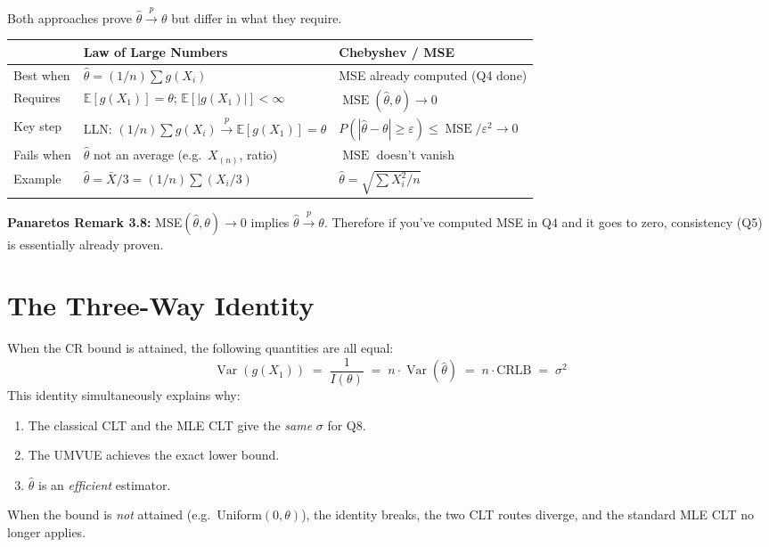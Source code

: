 \documentclass[11pt,a4paper]{article}
\newcommand{\E}{\mathbb{E}}
\newcommand{\Var}{\operatorname{Var}}
\newcommand{\MSE}{\operatorname{MSE}}
\newcommand{\convp}{\xrightarrow{\,p\,}}
\begin{document}
Both approaches prove $\hat\theta\convp\theta$ but differ in what they require.

\begin{center}
\renewcommand{\arraystretch}{1.4}
\begin{tabular}{@{}p{3.2cm}p{5.5cm}p{5.5cm}@{}}
\toprule
& \textbf{Law of Large Numbers} & \textbf{Chebyshev / MSE} \\
\midrule
Best when & $\hat\theta = (1/n)\sum g(X_i)$ & MSE already computed (Q4 done) \\
Requires & $\E[g(X_1)]=\theta$; $\E[|g(X_1)|]<\infty$ & $\MSE(\hat\theta,\theta)\to 0$ \\
Key step & LLN: $(1/n)\sum g(X_i)\convp \E[g(X_1)]=\theta$ & $P(|\hat\theta-\theta|\geq\varepsilon)\leq\MSE/\varepsilon^2\to 0$ \\
Fails when & $\hat\theta$ not an average (e.g.\ $X_{(n)}$, ratio) & $\MSE$ doesn't vanish \\
Example & $\hat\theta=\bar X/3 = (1/n)\sum(X_i/3)$ & $\hat\theta=\sqrt{\sum X_i^2/n}$ \\
\bottomrule
\end{tabular}
\end{center}

\begin{tcolorbox}[infobox]
\textbf{Panaretos Remark 3.8:} MSE$(\hat\theta,\theta)\to 0$ implies $\hat\theta\convp\theta$. Therefore if you've computed MSE in Q4 and it goes to zero, consistency (Q5) is essentially already proven.
\end{tcolorbox}

\section{The Three-Way Identity}

When the CR bound is attained, the following quantities are all equal:
\[
  \boxed{\Var(g(X_1)) \;=\; \frac{1}{I(\theta)} \;=\; n\cdot\Var(\hat\theta) \;=\; n\cdot\text{CRLB} \;=\; \sigma^2}
\]
This identity simultaneously explains why:
\begin{enumerate}[leftmargin=2em]
  \item The classical CLT and the MLE CLT give the \emph{same} $\sigma$ for Q8.
  \item The UMVUE achieves the exact lower bound.
  \item $\hat\theta$ is an \emph{efficient} estimator.
\end{enumerate}
When the bound is \emph{not} attained (e.g.\ Uniform$(0,\theta)$), the identity breaks, the two CLT routes diverge, and the standard MLE CLT no longer applies.
\end{document}

